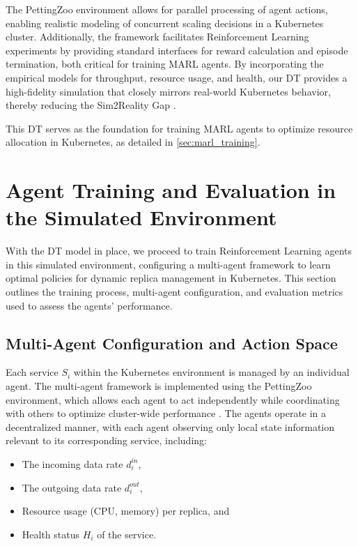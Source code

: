 \documentclass[conference]{IEEEtran}
\begin{document}
The PettingZoo environment allows for parallel processing of agent actions, enabling realistic modeling of concurrent scaling decisions in a Kubernetes cluster. Additionally, the framework facilitates Reinforcement Learning experiments by providing standard interfaces for reward calculation and episode termination, both critical for training MARL agents. By incorporating the empirical models for throughput, resource usage, and health, our DT provides a high-fidelity simulation that closely mirrors real-world Kubernetes behavior, thereby reducing the Sim2Reality Gap \cite{liu_dt_cloud}.

This DT serves as the foundation for training MARL agents to optimize resource allocation in Kubernetes, as detailed in \autoref{sec:marl_training}.


\section{Agent Training and Evaluation in the Simulated Environment}
\label{sec:marl_training}

With the DT model in place, we proceed to train Reinforcement Learning agents in this simulated environment, configuring a multi-agent framework to learn optimal policies for dynamic replica management in Kubernetes. This section outlines the training process, multi-agent configuration, and evaluation metrics used to assess the agents' performance.

\subsection{Multi-Agent Configuration and Action Space}

Each service $S_i$ within the Kubernetes environment is managed by an individual agent. The multi-agent framework is implemented using the PettingZoo environment, which allows each agent to act independently while coordinating with others to optimize cluster-wide performance \cite{pettingzoo_framework}. The agents operate in a decentralized manner, with each agent observing only local state information relevant to its corresponding service, including:
\begin{itemize}
    \item The incoming data rate $\mathit{d_i^{in}}$,
    \item The outgoing data rate $\mathit{d_i^{out}}$,
    \item Resource usage (CPU, memory) per replica, and
    \item Health status $\mathit{H_i}$ of the service.
\end{itemize}
\end{document}
